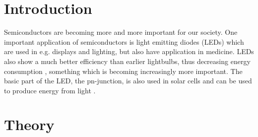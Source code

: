 \section{Introduction}
Semiconductors are becoming more and more important for our society. One important application of semiconductors is light emitting diodes (LEDs) \cite{hofmann2015} which are used in e.g. displays and lighting, but also have application in medicine. LEDs also show a much better efficiency than earlier lightbulbs, thus decreasing energy consumption \cite{hofmann2015}, something which is becoming increasingly more important. The basic part of the LED, the pn-junction, is also used in solar cells and can be used to produce energy from light \cite{hofmann2015}.

\section{Theory}
